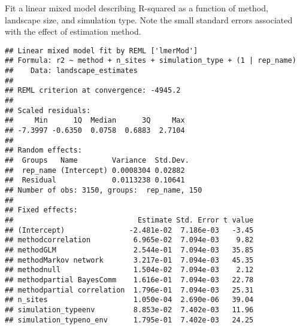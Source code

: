 \documentclass[11pt,]{article}
\newenvironment{Shaded}{\begin{snugshade}}{\end{snugshade}}
\newcommand{\KeywordTok}[1]{\textcolor[rgb]{0.13,0.29,0.53}{\textbf{{#1}}}}
\newcommand{\DataTypeTok}[1]{\textcolor[rgb]{0.13,0.29,0.53}{{#1}}}
\newcommand{\DecValTok}[1]{\textcolor[rgb]{0.00,0.00,0.81}{{#1}}}
\newcommand{\StringTok}[1]{\textcolor[rgb]{0.31,0.60,0.02}{{#1}}}
\newcommand{\OtherTok}[1]{\textcolor[rgb]{0.56,0.35,0.01}{{#1}}}
\newcommand{\NormalTok}[1]{{#1}}
\begin{document}
Fit a linear mixed model describing R-squared as a function of method,
landscape size, and simulation type. Note the small standard errors
associated with the effect of estimation method.

\begin{Shaded}
\end{Shaded}

\begin{verbatim}
## Linear mixed model fit by REML ['lmerMod']
## Formula: r2 ~ method + n_sites + simulation_type + (1 | rep_name)
##    Data: landscape_estimates
## 
## REML criterion at convergence: -4945.2
## 
## Scaled residuals: 
##     Min      1Q  Median      3Q     Max 
## -7.3997 -0.6350  0.0758  0.6883  2.7104 
## 
## Random effects:
##  Groups   Name        Variance  Std.Dev.
##  rep_name (Intercept) 0.0008304 0.02882 
##  Residual             0.0113238 0.10641 
## Number of obs: 3150, groups:  rep_name, 150
## 
## Fixed effects:
##                             Estimate Std. Error t value
## (Intercept)               -2.481e-02  7.186e-03   -3.45
## methodcorrelation          6.965e-02  7.094e-03    9.82
## methodGLM                  2.544e-01  7.094e-03   35.85
## methodMarkov network       3.217e-01  7.094e-03   45.35
## methodnull                 1.504e-02  7.094e-03    2.12
## methodpartial BayesComm    1.616e-01  7.094e-03   22.78
## methodpartial correlation  1.796e-01  7.094e-03   25.31
## n_sites                    1.050e-04  2.690e-06   39.04
## simulation_typeenv         8.853e-02  7.402e-03   11.96
## simulation_typeno_env      1.795e-01  7.402e-03   24.25
\end{verbatim}
\end{document}
